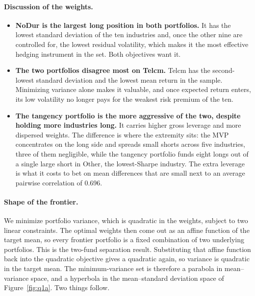 \documentclass[11pt]{article}
\begin{document}
\paragraph{Discussion of the weights.}
\begin{itemize}
\setlength{\itemsep}{3pt}\setlength{\parskip}{0pt}

\item \textbf{NoDur is the largest long position in both portfolios.} It has
the lowest standard deviation of the ten industries and, once the other nine
are controlled for, the lowest residual volatility, which makes it the most
effective hedging instrument in the set. Both objectives want it.

\item \textbf{The two portfolios disagree most on Telcm.} Telcm has the
second-lowest standard deviation and the lowest mean return in the sample.
Minimizing variance alone makes it valuable, and once expected return enters,
its low volatility no longer pays for the weakest risk premium of the ten.

\item \textbf{The tangency portfolio is the more aggressive of the two,
despite holding more industries long.} It carries higher gross leverage and
more dispersed weights. The difference is where the extremity sits: the MVP
concentrates on the long side and spreads small shorts across five industries,
three of them negligible, while the tangency portfolio funds eight longs out
of a single large short in Other, the lowest-Sharpe industry. The extra
leverage is what it costs to bet on mean differences that are small next to an
average pairwise correlation of 0.696.

\end{itemize}

\paragraph{Shape of the frontier.} We minimize portfolio variance, which is
quadratic in the weights, subject to two linear constraints. The optimal
weights then come out as an affine function of the target mean, so every
frontier portfolio is a fixed combination of two underlying portfolios. This
is the two-fund separation result. Substituting that affine function back into
the quadratic objective gives a quadratic again, so variance is quadratic in
the target mean. The minimum-variance set is therefore a parabola in
mean--variance space, and a hyperbola in the mean--standard deviation space of
Figure~\ref{fig:q1a}. Two things follow.
\end{document}

